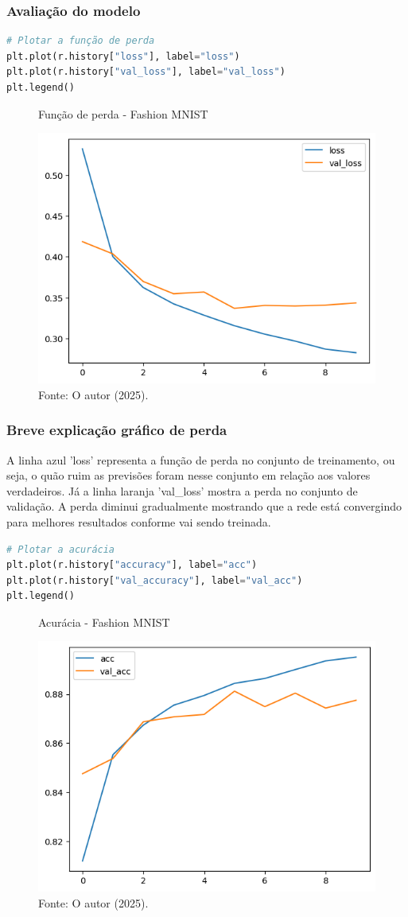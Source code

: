 \subsubsection*{Avaliação do modelo}
\begin{lstlisting}[language=Python, style=input]
# Plotar a função de perda
plt.plot(r.history["loss"], label="loss")
plt.plot(r.history["val_loss"], label="val_loss")
plt.legend()
\end{lstlisting}
\begin{figure}[H]
\centering
\caption{Função de perda - Fashion MNIST}
\includegraphics[width=.8\linewidth]{apendices/fig/13_IAA012_1.png}
\caption*{Fonte: O autor (2025).}
\end{figure}
\subsubsection*{Breve explicação gráfico de perda}
A linha azul 'loss' representa a função de perda no conjunto de treinamento, ou seja, o quão ruim as previsões foram nesse conjunto em relação aos valores verdadeiros. Já a linha laranja 'val\_loss' mostra a perda no conjunto de validação. A perda diminui gradualmente mostrando que a rede está convergindo para melhores resultados conforme vai sendo treinada.
\begin{lstlisting}[language=Python, style=input]
# Plotar a acurácia
plt.plot(r.history["accuracy"], label="acc")
plt.plot(r.history["val_accuracy"], label="val_acc")
plt.legend()
\end{lstlisting}
\begin{figure}[H]
\centering
\caption{Acurácia - Fashion MNIST}
\includegraphics[width=.8\linewidth]{apendices/fig/13_IAA012_2.png}
\caption*{Fonte: O autor (2025).}
\end{figure}
